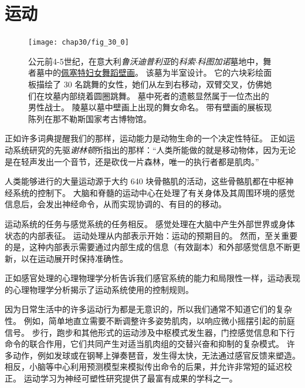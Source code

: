 \part{运动}

\begin{figure}[htbp]
	\centering
	\texttt{[image: chap30/fig\_30\_0]}
	\caption{公元前4-5世纪，在意大利\textit{鲁沃迪普利亚}的\textit{科索$\cdot$科图加诺}墓地中，舞者墓中的\href{https://en.wikipedia.org/wiki/Tomb_of_the_Dancers}{佩塞特妇女舞蹈壁画}。
		该墓为半室设计。
		它的六块彩绘面板描绘了 30 名跳舞的女性，她们从左到右移动，双臂交叉，仿佛她们在坟墓内部绕着圆圈跳舞。
		墓中死者的遗骸显然属于一位杰出的男性战士。
		陵墓以墓中壁画上出现的舞女命名。
		带有壁画的展板现陈列在那不勒斯国家考古博物馆。 }
	\label{fig:30_0}
\end{figure}


正如许多词典提醒我们的那样，运动能力是动物生命的一个决定性特征。
正如运动系统研究的先驱\textit{谢林顿}所指出的那样：“人类所能做的就是移动物体，因为无论是在轻声发出一个音节，还是砍伐一片森林，唯一的执行者都是肌肉。”


人类能够进行的大量运动源于大约 640 块骨骼肌的活动，这些骨骼肌都在中枢神经系统的控制下。
大脑和脊髓的运动中心在处理了有关身体及其周围环境的感觉信息后，会发出神经命令，从而实现协调的、有目的的移动。


运动系统的任务与感觉系统的任务相反。
感觉处理在大脑中产生外部世界或身体状态的内部表征。
运动处理从内部表示开始：运动的预期目的。
然而，至关重要的是，这种内部表示需要通过内部生成的信息（有效副本）和外部感觉信息不断更新，以在运动展开时保持准确性。


正如感官处理的心理物理学分析告诉我们感官系统的能力和局限性一样，运动表现的心理物理学分析揭示了运动系统使用的控制规则。


因为日常生活中的许多运动行为都是无意识的，所以我们通常不知道它们的复杂性。
例如，简单地直立需要不断调整许多姿势肌肉，以响应微小摇摆引起的前庭信号。
步行，跑步和其他形式的运动涉及中枢模式发生器，门控感觉信息和下行命令的联合作用，它们共同产生对适当肌肉组的交替兴奋和抑制的复杂模式。
许多动作，例如发球或在钢琴上弹奏琶音，发生得太快，无法通过感官反馈来塑造。
相反，小脑等中心利用预测模型来模拟传出命令的后果，并允许非常短的延迟校正。
运动学习为神经可塑性研究提供了最富有成果的学科之一。


